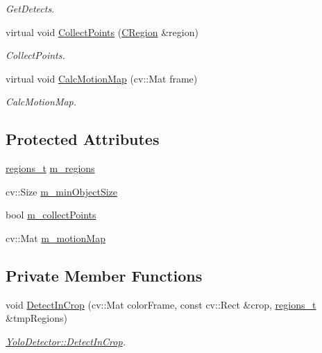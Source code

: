 \begin{DoxyCompactItemize}
\begin{DoxyCompactList}\small\item\em Get\+Detects. \end{DoxyCompactList}\item 
virtual void \mbox{\hyperlink{class_base_detector_a20380b0980c6f262b0829f37fb89d2a7}{Collect\+Points}} (\mbox{\hyperlink{class_c_region}{C\+Region}} \&region)
\begin{DoxyCompactList}\small\item\em Collect\+Points. \end{DoxyCompactList}\item 
virtual void \mbox{\hyperlink{class_base_detector_a73c66f0d4dad263fcf65c09a6f6feda2}{Calc\+Motion\+Map}} (cv\+::\+Mat frame)
\begin{DoxyCompactList}\small\item\em Calc\+Motion\+Map. \end{DoxyCompactList}\end{DoxyCompactItemize}
\subsection*{Protected Attributes}
\begin{DoxyCompactItemize}
\item 
\mbox{\hyperlink{defines_8h_a01db0de56a20f4342820a093c5154536}{regions\+\_\+t}} \mbox{\hyperlink{class_base_detector_a409c20093acba261db8354ca72058fce}{m\+\_\+regions}}
\item 
cv\+::\+Size \mbox{\hyperlink{class_base_detector_a651b938c89c94daac4763728637d90c9}{m\+\_\+min\+Object\+Size}}
\item 
bool \mbox{\hyperlink{class_base_detector_a403cbf784fcb960bdb7d080c86c4a2ea}{m\+\_\+collect\+Points}}
\item 
cv\+::\+Mat \mbox{\hyperlink{class_base_detector_a45a2d54a0b69e271aa5c44ee301682b7}{m\+\_\+motion\+Map}}
\end{DoxyCompactItemize}
\subsection*{Private Member Functions}
\begin{DoxyCompactItemize}
\item 
void \mbox{\hyperlink{class_yolo_detector_ad3ca3f52cee36d143b015a3f5f99ebf6}{Detect\+In\+Crop}} (cv\+::\+Mat color\+Frame, const cv\+::\+Rect \&crop, \mbox{\hyperlink{defines_8h_a01db0de56a20f4342820a093c5154536}{regions\+\_\+t}} \&tmp\+Regions)
\begin{DoxyCompactList}\small\item\em \mbox{\hyperlink{class_yolo_detector_ad3ca3f52cee36d143b015a3f5f99ebf6}{Yolo\+Detector\+::\+Detect\+In\+Crop}}. \end{DoxyCompactList}\end{DoxyCompactItemize}
